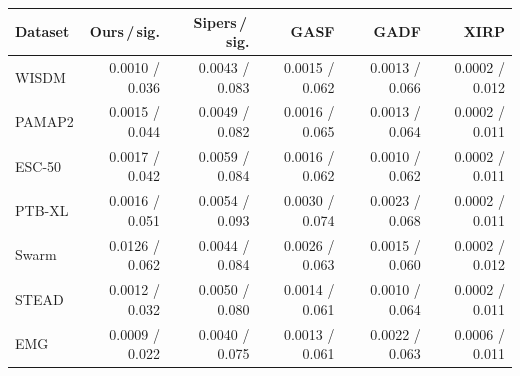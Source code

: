 \begin{tabular}{@{}lrrrrr@{}}
\toprule
Dataset & Ours\,/\,sig. & Sipers\,/\,sig. & GASF & GADF & XIRP \\
\midrule
WISDM & 0.0010 / 0.036 & 0.0043 / 0.083 & 0.0015 / 0.062 & 0.0013 / 0.066 & 0.0002 / 0.012 \\
PAMAP2 & 0.0015 / 0.044 & 0.0049 / 0.082 & 0.0016 / 0.065 & 0.0013 / 0.064 & 0.0002 / 0.011 \\
ESC-50 & 0.0017 / 0.042 & 0.0059 / 0.084 & 0.0016 / 0.062 & 0.0010 / 0.062 & 0.0002 / 0.011 \\
PTB-XL & 0.0016 / 0.051 & 0.0054 / 0.093 & 0.0030 / 0.074 & 0.0023 / 0.068 & 0.0002 / 0.011 \\
Swarm & 0.0126 / 0.062 & 0.0044 / 0.084 & 0.0026 / 0.063 & 0.0015 / 0.060 & 0.0002 / 0.012 \\
STEAD & 0.0012 / 0.032 & 0.0050 / 0.080 & 0.0014 / 0.061 & 0.0010 / 0.064 & 0.0002 / 0.011 \\
EMG & 0.0009 / 0.022 & 0.0040 / 0.075 & 0.0013 / 0.061 & 0.0022 / 0.063 & 0.0006 / 0.011 \\
\bottomrule
\end{tabular}
